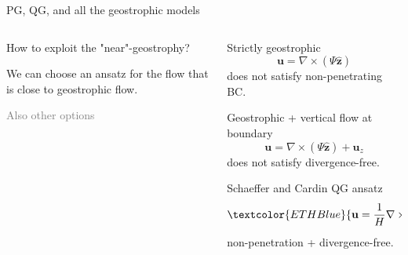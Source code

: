 \documentclass[11pt,aspectratio=169]{beamer}
\begin{document}
\begin{frame}{PG, QG, and all the geostrophic models}
\begin{columns}
	\begin{column}{.45\linewidth}
		How to exploit the \textcolor{ETHRed}{"near"-geostrophy}?
		\vspace{1em}

		We can choose an ansatz for the flow that is close to geostrophic flow.
		\vspace{1em}

		\textcolor{gray}{Also other options}
	\end{column}
	\begin{column}{.45\linewidth}
		Strictly geostrophic
		\[
			\mathbf{u} = \nabla\times (\Psi \hat{\mathbf{z}})
		\]
		does not satisfy non-penetrating BC.
		\vspace{.5em}
		\pause

		Geostrophic + vertical flow at boundary
		\[
			\mathbf{u} = \nabla\times (\Psi \hat{\mathbf{z}}) + \mathbf{u}_z
		\]
		does not satisfy divergence-free.
		\vspace{.5em}
		\pause

		\textcolor{ETHBlue}{Schaeffer and Cardin QG ansatz}
		\[
			\textcolor{ETHBlue}{\mathbf{u} = \frac{1}{H}\nabla\times (\Psi \hat{\mathbf{z}}) + \frac{z}{sH^2} \frac{dH}{ds} \frac{\partial \Psi}{\partial \phi} \hat{\mathbf{z}}}
		\]
		\textcolor{ETHBlue}{non-penetration + divergence-free.}
	\end{column}
\end{columns}
\end{frame}
\end{document}
